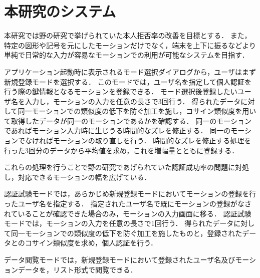 \section{本研究のシステム}
本研究では野の研究で挙げられていた本人拒否率の改善を目標とする．
また，特定の図形や記号を元にしたモーションだけでなく，端末を上下に振るなどより単純で日常的な入力が容易なモーションでの利用が可能なシステムを目指す．


アプリケーション起動時に表示されるモード選択ダイアログから，ユーザはまず新規登録モードを選択する．
このモードでは，ユーザ名を指定して個人認証を行う際の鍵情報となるモーションを登録できる．
モード選択後登録したいユーザ名を入力し，モーションの入力を任意の長さで3回行う．
得られたデータに対して同一モーションでの類似度の低下を防ぐ加工を施し，コサイン類似度を用いて取得したデータが同一のモーションであるかを確認する．
同一のモーションであればモーション入力時に生じうる時間的なズレを修正する．
同一のモーションでなければモーションの取り直しを行う．
時間的なズレを修正する処理を行った3回分のデータから平均値を求め，これを増幅量とともに登録する．

これらの処理を行うことで野の研究であげられていた認証成功率の問題に対処し，対応できるモーションの幅を広げている．

認証試験モードでは，あらかじめ新規登録モードにおいてモーションの登録を行ったユーザ名を指定する．
指定されたユーザ名で既にモーションの登録がなされていることが確認できた場合のみ，モーションの入力画面に移る．
認証試験モードでは，モーションの入力を任意の長さで1回行う．
得られたデータに対して同一モーションでの類似度の低下を防ぐ加工を施したものと，登録されたデータとのコサイン類似度を求め，個人認証を行う．

データ閲覧モードでは，新規登録モードにおいて登録されたユーザ名及びモーションデータを，リスト形式で閲覧できる．

